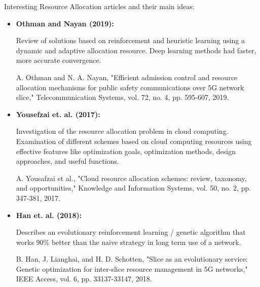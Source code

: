 \documentclass[12pt]{article} %
\begin{document}
    Interesting Resource Allocation articles and their main ideas:
    \begin{itemize}
        \item \textbf{Othman and Nayan (2019): }

            Review of solutions based on reinforcement and heuristic learning using a dynamic and adaptive allocation resource. Deep learning methods had faster, more accurate convergence. 
            
            A. Othman and N. A. Nayan, "Efficient admission control and resource allocation mechanisms for public safety
    communications over 5G network slice," Telecommunication Systems, vol. 72, no. 4, pp. 595-607, 2019.

        \item \textbf{Yousefzai et. al. (2017): }
    
            Investigation of the resource allocation problem in cloud computing. Examination of different schemes based on cloud computing resources using effective features like optimization goals, optimization methods, design approaches, and useful functions. 
            
            A. Yousafzai et al., "Cloud resource allocation schemes: review, taxonomy, and opportunities," Knowledge and Information Systems, vol. 50, no. 2, pp. 347-381, 2017.
            
        \item \textbf{Han et. al. (2018): }
    
            Describes an evolutionary reinforcement learning / genetic algorithm that works 90\% better than the naive strategy in long term use of a network. 
            
            B. Han, J. Lianghai, and H. D. Schotten, "Slice as an evolutionary service: Genetic optimization for inter-slice resource management in 5G networks," IEEE Access, vol. 6, pp. 33137-33147, 2018.
        
    \end{itemize}
\end{document}
